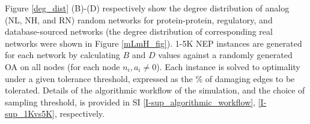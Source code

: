       Figure \ref{deg_dist}  (B)-(D) respectively show the degree distribution of analog (NL, NH, and RN) random networks for protein-protein, regulatory, and database-sourced networks (the degree distribution of corresponding real networks were shown in Figure \ref{mLmH_fig}).
      1-5K NEP instances are generated for each network by calculating $B$ and $D$ values against a randomly generated OA on all nodes (for each node $n_i, a_i\neq 0$).
      Each instance is solved to optimality under a given tolerance threshold, expressed as the \% of damaging edges to be tolerated. Details of
      the algorithmic workflow of the simulation, and the choice of sampling threshold, is provided in SI \ref{I-sup_algorithmic_workflow}, \ref{I-sup_1Kvs5K}, respectively.
